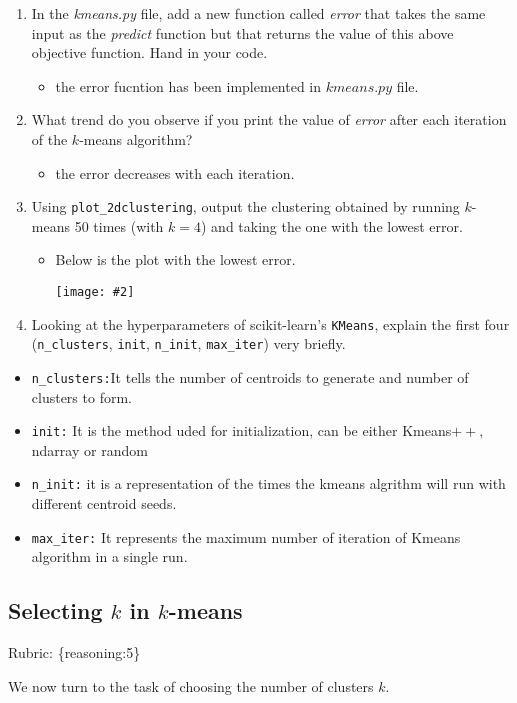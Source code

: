 \documentclass{article}
\def\gre#1{{\color{gre}#1}}
\newcommand{\centerfig}[2]{\begin{center}\texttt{[image: \#2]}\end{center}}
\def\items#1{\begin{itemize}#1\end{itemize}}
\def\enum#1{\begin{enumerate}#1\end{enumerate}}
\def\rubric#1{\gre{Rubric: \{#1\}}}{}
\begin{document}
 {\enum{
 \item In the \emph{kmeans.py} file, add a new function called \emph{error} that takes the same input as the \emph{predict} function but that returns the value of this above objective function. Hand in your code.
\items{
\item the error fucntion has been implemented in $kmeans.py$ file.
}
 \item What trend do you observe if you print the value of \emph{error} after each iteration of the $k$-means algorithm?
\items{
\item the error decreases with each iteration.
}
 \item Using \texttt{plot\_2dclustering}, output the clustering obtained by running $k$-means 50 times (with $k=4$) and taking the one with the lowest error.
\items{
\item Below is the plot with the lowest error. \centerfig {.5}{../figs/kmeans_3_1_3.png}
}
 \item Looking at the hyperparameters of scikit-learn's \texttt{KMeans}, explain the first four (\texttt{n\_clusters}, \texttt{init}, \texttt{n\_init}, \texttt{max\_iter}) very briefly.
 }
\items{
\item \texttt{n\_clusters:}It tells the number of centroids to generate and number of clusters to form.
\item \texttt{init:} It is the  method uded for initialization, can be either Kmeans$++$, ndarray or random
\item\texttt{n\_init:} it is a representation of the times the kmeans algrithm will run with different centroid seeds.
\item \texttt{max\_iter:} It represents the maximum number of iteration of Kmeans algorithm in a single run.
}



 \subsection{Selecting $k$ in $k$-means}
\rubric{reasoning:5}

 We now turn to the task of choosing the number of clusters $k$.

}
\end{document}
